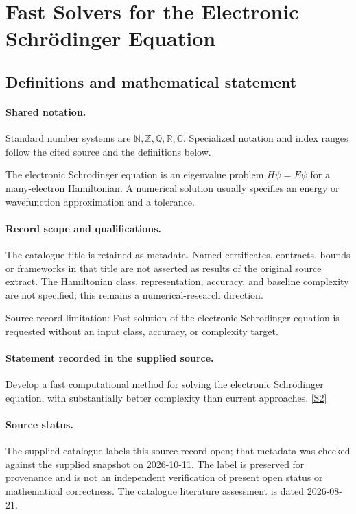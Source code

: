 \documentclass[11pt]{article}
\newcommand{\sref}[2]{\hyperlink{source:#1:#2}{[S#2]}}
\begin{document}
\section{Fast Solvers for the Electronic Schrödinger Equation}\label{statement}

\subsection{Definitions and mathematical statement}

\paragraph{Shared notation.}Standard number systems are $\mathbb N,\mathbb Z,\mathbb Q,\mathbb R,\mathbb C$. Specialized notation and index ranges follow the cited source and the definitions below.


The electronic Schrodinger equation is an eigenvalue problem $H\psi=E\psi$ for a many-electron Hamiltonian. A numerical solution usually specifies an energy or wavefunction approximation and a tolerance.
\paragraph{Record scope and qualifications.}
The catalogue title is retained as metadata. Named certificates, contracts, bounds or frameworks in that title are not asserted as results of the original source extract.
The Hamiltonian class, representation, accuracy, and baseline complexity are not specified; this remains a numerical-research direction.

Source-record limitation: Fast solution of the electronic Schrodinger equation is requested without an input class, accuracy, or complexity target.
\paragraph{Statement recorded in the supplied source.}
Develop a fast computational method for solving the electronic Schrödinger equation, with substantially better complexity than current approaches. \sref{statement}{2}
\paragraph{Source status.}
The supplied catalogue labels this source record open; that metadata was checked against the supplied snapshot on 2026-10-11. The label is preserved for provenance and is not an independent verification of present open status or mathematical correctness. The catalogue literature assessment is dated 2026-08-21.
\end{document}
